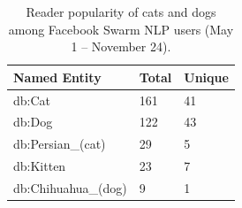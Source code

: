 \documentclass{iosart2c}
\begin{document}
\begin{table}
    \begin{tabular}{ | l | l | l |}
    \hline
	\textbf{Named Entity} & \textbf{Total} & \textbf{Unique} \\ \hline
	db:Cat & 161 & 41\\
	db:Dog & 122 & 43\\
	db:Persian\_(cat) &29 &5\\
	db:Kitten & 23 & 7\\
	db:Chihuahua\_(dog) & 9 & 1\\
    \hline
  \end{tabular}
  \caption{Reader popularity of cats and dogs among Facebook Swarm NLP users (May 1 -- November 24).}
  \label{tab:kittens}  
\end{table}

\begin{table}
  \centering
  \qquad
  \caption{Raw statistics on absolute, total and unique number of occurrences of named entities (May~1 -- November~12).}
  \label{tab:raw}
\end{table}

\end{document}
